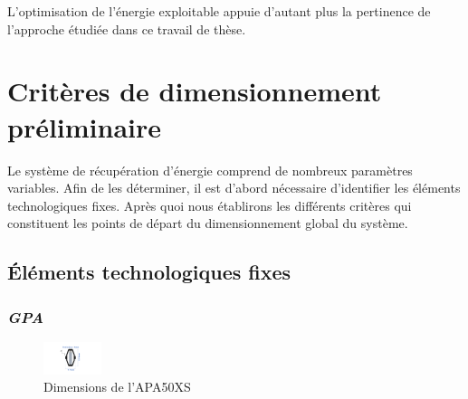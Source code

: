 L'optimisation de l'énergie exploitable appuie d'autant plus la pertinence de l'approche étudiée dans ce travail de thèse.
\section{Critères de dimensionnement préliminaire}
\label{sec:2.5:Criteres de dimensionnement preliminaire}
Le système de récupération d'énergie comprend de nombreux paramètres variables. Afin de les déterminer, il est d'abord nécessaire d'identifier les éléments technologiques fixes. Après quoi nous établirons les différents critères qui constituent les points de départ du dimensionnement global du système. 
	\subsection{Éléments technologiques fixes}
	\label{subsec:2.5.1_Elements technologiques fixes}	
\subsubsection*{\textit{GPA}}
\begin{table}[!htbp]
	\centering
	\caption{Paramètres pour l'APA50XS}
	\label{tab:parametres_apa50xs}
\end{table}
\begin{figure}[!htbp]
	\begin{center}
		\captionsetup{justification=centering}
		\includegraphics[trim={9.8cm 2.3cm 12.5cm 2.2cm},clip, width=0.15\textwidth]{../Chap2/Figure/dessin APA_dimensions.pdf}
		\caption{Dimensions de l'APA50XS}
		\label{fig:dimensions_apa50xs}
	\end{center}
\end{figure}

